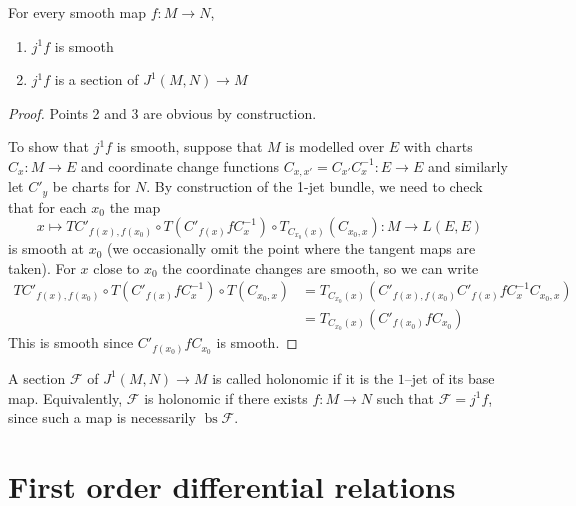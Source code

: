 \documentclass[10pt,a4paper]{article}
\newcommand{\co}{\!:}
\newcommand{\F}{\mathcal{F}} %
\DeclareMathOperator{\bs}{bs} %
\newcommand{\uses}[1]{}
\newcommand{\lean}[1]{}
\newcommand{\leanok}{}
\begin{document}
\begin{lemma}
\label{lem:one_jet_extension_prop}
\lean{ContMDiff.oneJetExt}
\leanok
\uses{def:one_jet_extension}
For every smooth map $f \co M → N$,
\begin{enumerate}
  \item
    \label{lem:one_jet_smooth}\uses{def:one_jet_space, def:one_jet_extension}
    $j^1f$ is smooth
  \item
    \label{lem:one_jet_section}\uses{def:one_jet_space, def:one_jet_extension}
    $j^1f$ is a section of $J^1(M, N) → M$
\end{enumerate}
\end{lemma}

\begin{proof}
  \leanok
  Points 2 and 3 are obvious by construction.

  To show that $j^1f$ is smooth, suppose that $M$ is modelled over $E$ with charts
  $C_x : M \to E$ and coordinate change functions
  $C_{x,x'}=C_{x'}C_x^{-1} : E \to E$ and similarly let $C'_y$ be charts for $N$.
  By construction of the 1-jet bundle, we need to check that for each $x_0$ the map
  $$x\mapsto TC'_{f(x),f(x_0)}\circ T(C'_{f(x)}fC_x^{-1})\circ
    T_{C_{x_0}(x)}(C_{x_0,x}): M \to L(E,E)$$
  is smooth at $x_0$ (we occasionally omit the point where the tangent maps are taken).
  For $x$ close to $x_0$ the coordinate changes are smooth, so we can write
  \begin{align*}
  TC'_{f(x),f(x_0)}\circ T(C'_{f(x)}fC_x^{-1})\circ T(C_{x_0,x})
  &= T_{C_{x_0}(x)}(C'_{f(x),f(x_0)}C'_{f(x)}fC_x^{-1}C_{x_0,x})\\
  &= T_{C_{x_0}(x)}(C'_{f(x_0)}fC_{x_0})
  \end{align*}
  This is smooth since $C'_{f(x_0)}fC_{x_0}$ is smooth.
\end{proof}

\begin{definition}
\label{def:holonomic_section}
\leanok
\lean{OneJetSec.IsHolonomicAt, OneJetSec.isHolonomicAt_iff}
\uses{def:one_jet_space}
A section $\F$ of $J^1(M, N) → M$ is called holonomic if it is the
$1$--jet of its base map.
Equivalently, $\F$ is holonomic if there exists
$f \co M → N$ such that $\F = j^1f$, since such a map is
necessarily $\bs \F$.
\end{definition}

\section{First order differential relations}
\end{document}
